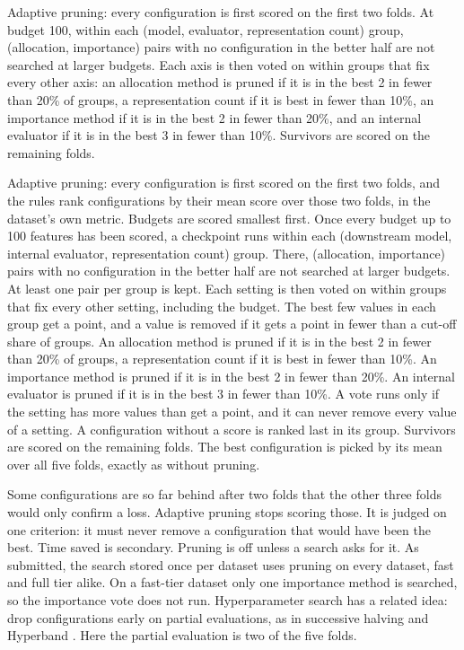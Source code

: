 Adaptive pruning: every configuration is first scored on the first two folds. At budget 100, within each (model, evaluator, representation count) group, (allocation, importance) pairs with no configuration in the better half are not searched at larger budgets. Each axis is then voted on within groups that fix every other axis: an allocation method is pruned if it is in the best 2 in fewer than 20\% of groups, a representation count if it is best in fewer than 10\%, an importance method if it is in the best 2 in fewer than 20\%, and an internal evaluator if it is in the best 3 in fewer than 10\%. Survivors are scored on the remaining folds.

Adaptive pruning: every configuration is first scored on the first two folds, and the rules rank configurations by their mean score over those two folds, in the dataset's own metric. Budgets are scored smallest first. Once every budget up to 100 features has been scored, a checkpoint runs within each (downstream model, internal evaluator, representation count) group. There, (allocation, importance) pairs with no configuration in the better half are not searched at larger budgets. At least one pair per group is kept. Each setting is then voted on within groups that fix every other setting, including the budget. The best few values in each group get a point, and a value is removed if it gets a point in fewer than a cut-off share of groups. An allocation method is pruned if it is in the best 2 in fewer than 20\% of groups, a representation count if it is best in fewer than 10\%. An importance method is pruned if it is in the best 2 in fewer than 20\%. An internal evaluator is pruned if it is in the best 3 in fewer than 10\%. A vote runs only if the setting has more values than get a point, and it can never remove every value of a setting. A configuration without a score is ranked last in its group. Survivors are scored on the remaining folds. The best configuration is picked by its mean over all five folds, exactly as without pruning.

Some configurations are so far behind after two folds that the other three folds would only confirm a loss. Adaptive pruning stops scoring those. It is judged on one criterion: it must never remove a configuration that would have been the best. Time saved is secondary. Pruning is off unless a search asks for it. As submitted, the search stored once per dataset uses pruning on every dataset, fast and full tier alike. On a fast-tier dataset only one importance method is searched, so the importance vote does not run. Hyperparameter search has a related idea: drop configurations early on partial evaluations, as in successive halving \citep{Jamieson2016} and Hyperband \citep{Li2018Hyperband}. Here the partial evaluation is two of the five folds.

